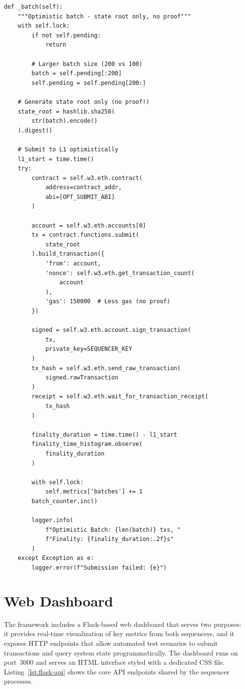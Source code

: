 \begin{listing}[H]
    \begin{verbatim}
def _batch(self):
    """Optimistic batch - state root only, no proof"""
    with self.lock:
        if not self.pending:
            return
        
        # Larger batch size (200 vs 100)
        batch = self.pending[:200]
        self.pending = self.pending[200:]
    
    # Generate state root only (no proof!)
    state_root = hashlib.sha256(
        str(batch).encode()
    ).digest()
    
    # Submit to L1 optimistically
    l1_start = time.time()
    try:
        contract = self.w3.eth.contract(
            address=contract_addr,
            abi=[OPT_SUBMIT_ABI]
        )
        
        account = self.w3.eth.accounts[0]
        tx = contract.functions.submit(
            state_root
        ).build_transaction({
            'from': account,
            'nonce': self.w3.eth.get_transaction_count(
                account
            ),
            'gas': 150000  # Less gas (no proof)
        })
        
        signed = self.w3.eth.account.sign_transaction(
            tx, 
            private_key=SEQUENCER_KEY
        )
        tx_hash = self.w3.eth.send_raw_transaction(
            signed.rawTransaction
        )
        receipt = self.w3.eth.wait_for_transaction_receipt(
            tx_hash
        )
        
        finality_duration = time.time() - l1_start
        finality_time_histogram.observe(
            finality_duration
        )
        
        with self.lock:
            self.metrics['batches'] += 1
        batch_counter.inc()
        
        logger.info(
            f"Optimistic Batch: {len(batch)} txs, "
            f"Finality: {finality_duration:.2f}s"
        )
    except Exception as e:
        logger.error(f"Submission failed: {e}")
    \end{verbatim}
    \caption{Optimistic rollup sequencer differences}
    \label{lst:opt-sequencer}
\end{listing}

\section{Web Dashboard}

The framework includes a Flask-based web dashboard that serves two purposes: it provides real-time visualization of key metrics from both sequencers, and it exposes HTTP endpoints that allow automated test scenarios to submit transactions and query system state programmatically. The dashboard runs on port~3000 and serves an HTML interface styled with a dedicated CSS file. Listing~\ref{lst:flask-api} shows the core API endpoints shared by the sequencer processes.

